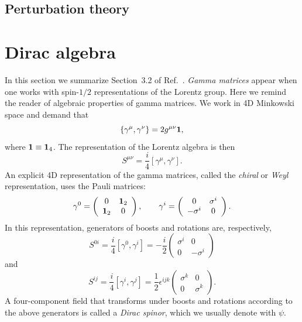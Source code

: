 \subsection{Perturbation theory}

\section{Dirac algebra}
In this section we summarize Section~3.2 of 
Ref.~\cite{peskin_introduction_1995}.
{\it Gamma matrices} appear when one works with spin-$1/2$ representations of
the Lorentz group. Here we remind the reader of algebraic properties of gamma
matrices. We work in 4D Minkowski space and demand that
\begin{equation}
  \left\{\gamma^\mu,\gamma^\nu\right\}=2g^{\mu\nu}{\mathbf 1},
\end{equation}
where ${\mathbf 1}\equiv{\mathbf 1}_4$. The representation of the Lorentz algebra is then
\begin{equation}
  S^{\mu\nu}=\frac{i}{4}\left[\gamma^\mu,\gamma^\nu\right].
\end{equation}
An explicit 4D representation of the gamma matrices, called the {\it chiral} 
or {\it Weyl} representation, uses the Pauli matrices:
\begin{equation}
  \gamma^0=\left(\begin{array}{cc}
                 0      & {\mathbf 1}_2    \\
                 {\mathbf 1}_2  & 0
           \end{array}\right), \qquad
  \gamma^i=\left(\begin{array}{cc}
                 0         & \sigma^i \\
                 -\sigma^i & 0
           \end{array}\right).
\end{equation}
In this representation, generators of boosts and rotations are, respectively,
\begin{equation}
  S^{0i}=\frac{i}{4}\left[\gamma^0,\gamma^i\right]
        =-\frac{i}{2}
         \left(\begin{array}{cc}
           \sigma^i & 0        \\
           0        & -\sigma^i
         \end{array}\right)
\end{equation}
and
\begin{equation}
  S^{ij}=\frac{i}{4}\left[\gamma^i,\gamma^j\right]
        =\frac{1}{2}\epsilon^{ijk}
         \left(\begin{array}{cc}
           \sigma^k & 0        \\
           0        & \sigma^k
         \end{array}\right).
\end{equation}
A four-component field that transforms under boosts and rotations according to
the above generators is called a {\it Dirac spinor}, which we usually denote
with $\psi$. 

